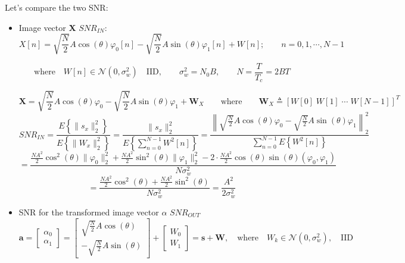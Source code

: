 \noindent Let's compare the two SNR:
\begin{itemize}
    \item Image vector \textbf{X} \(SNR_{IN}\):
    \[
X[n] = \sqrt{\frac{N}{2}} A \cos(\theta) \varphi_0[n]
     - \sqrt{\frac{N}{2}} A \sin(\theta) \varphi_1[n]
     + W[n]; \qquad n = 0, 1, \cdots, N-1
\]

\[
\text{where} \quad W[n] \in \mathcal{N} \left(0, \sigma_w^2 \right)\quad \text{IID}, \qquad
\sigma_w^2 = N_0 B, \qquad N = \frac{T}{T_c} = 2BT
\]

\[
\mathbf{X} = \sqrt{\frac{N}{2}} A \cos(\theta) \varphi_0
           - \sqrt{\frac{N}{2}} A \sin(\theta) \varphi_1
           + \mathbf{W}_X
           \qquad \text{where} \qquad \mathbf{W}_X \triangleq [W[0]\; W[1]\; \cdots\; W[N-1]]^T
\]
\[
SNR_{IN} = \frac{E\left\{\|s_x\|_2^2\right\}}{E\left\{\|W_x\|_2^2\right\}}
= \frac{ \|s_x\|_2^2 }{ E\left\{ \sum_{n=0}^{N-1} W^2[n] \right\} }
= \frac{ \left\| \sqrt{\frac{N}{2}} A\cos(\theta) \varphi_0 - \sqrt{\frac{N}{2}} A\sin(\theta) \varphi_1 \right\|_2^2 }
         { \sum_{n=0}^{N-1} E\left\{ W^2[n] \right\} }
\]
\[
= \frac{
  \frac{N A^2}{2} \cos^2(\theta) \|\varphi_0\|_2^2
+ \frac{N A^2}{2} \sin^2(\theta) \|\varphi_1\|_2^2
- 2\cdot \frac{N A^2}{2} \cos(\theta)\sin(\theta) (\varphi_0,\varphi_1)
}{
  N \sigma_w^2
}
\]
\[
= \frac{
  \frac{N A^2}{2} \cos^2(\theta) + \frac{N A^2}{2} \sin^2(\theta)
}{
  N \sigma_w^2
}
= \frac{A^2}{2 \sigma_w^2}
\]
\item SNR for the transformed image vector \(\alpha\) \(SNR_{OUT}\)
\[
\mathbf{a} =
\begin{bmatrix}
    \alpha_0 \\
    \alpha_1
\end{bmatrix}
=
\begin{bmatrix}
    \sqrt{\frac{N}{2}} A \cos(\theta) \\
    -\sqrt{\frac{N}{2}} A \sin(\theta)
\end{bmatrix}
+
\begin{bmatrix}
    W_0 \\
    W_1
\end{bmatrix}
= \mathbf{s} + \mathbf{W}, \quad
\text{where} \quad W_k \in \mathcal{N}(0,\sigma_w^2),\quad \text{IID}
\]


\end{itemize}
